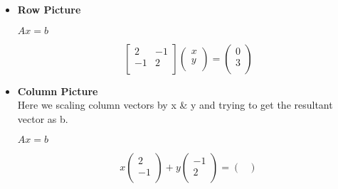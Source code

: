 \documentclass[a4paper,11pt]{article}
\numberwithin{equation}{section}
\begin{document}
\begin{itemize}
\begin{itemize}
                \item \textbf{Row Picture}
                    \vspace{5pt}
                    \begin{center}
                        $Ax=b$
                    \end{center}
                            \[\begin{bmatrix}
                                2 & -1 \\
                                -1 & 2 \\
                            \end{bmatrix}
                            \begin{pmatrix}
                                x\\
                                y\\
                            \end{pmatrix}=
                            \begin{pmatrix}
                                0\\
                                3\\
                            \end{pmatrix}
                            \]                
                \item \textbf{Column Picture}
                    \vspace{5pt}\\
                    Here we scaling column vectors by x \& y and trying to get the resultant vector as b.\\
                    \begin{center}
                        $Ax=b$
                    \end{center}
                            \[x
                            \begin{pmatrix}
                                2  \\
                                -1  \\
                            \end{pmatrix}+y
                            \begin{pmatrix}
                                -1\\
                                2\\
                            \end{pmatrix}=
                            \begin{pmatrix}

\end{pmatrix}\]
\end{itemize}
\end{itemize}
\end{document}
